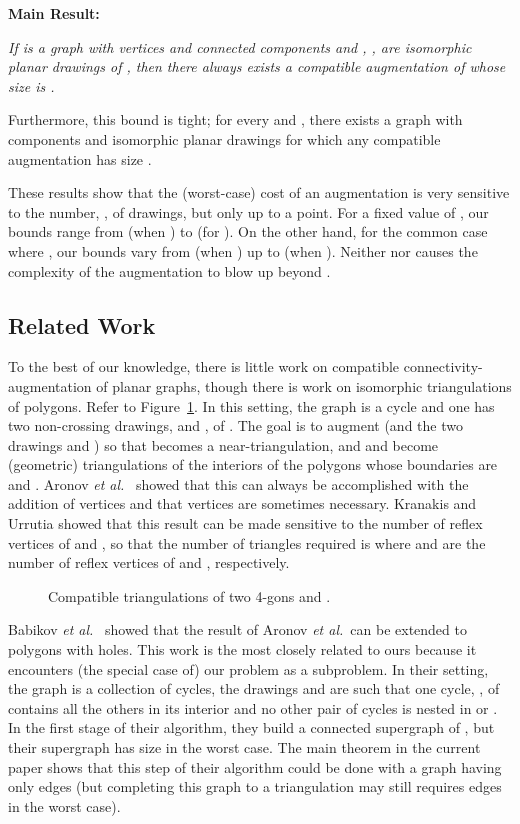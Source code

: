 \documentclass[11pt]{patmorin}
\newcommand{\etal}{\emph{et al.}}
\begin{document}
\noindent\textbf{Main Result:} {\itshape If  is a graph
with  vertices and  connected components and
, , are isomorphic planar drawings of , then there always exists a compatible augmentation of 
whose size is .

Furthermore, this bound is tight; for every  and , there exists a graph 
with  components and  isomorphic planar drawings for which any compatible
augmentation has size .}

These results show that the (worst-case) cost of an augmentation is very
sensitive to the number, , of drawings, but only up to a point.
For a fixed value of , our bounds range from  (when
) to  (for ).  On the other hand, for the
common case where , our bounds vary from  (when ) up to  (when ).  Neither  nor 
causes the complexity of the augmentation to blow up beyond .

\subsection{Related Work}

To the best of our knowledge, there is little work on
compatible connectivity-augmentation of planar graphs, though
there is work on isomorphic triangulations of polygons.  Refer to
Figure~\ref{fig:compatible-triangs}.  In this setting, the graph
 is a cycle and one has two non-crossing drawings, 
and , of . The goal is to augment  (and the
two drawings  and ) so that  becomes a near-triangulation,
and  and  become (geometric) triangulations of the interiors
of the polygons whose boundaries are  and .  Aronov \etal\
\cite{aronov.seidel.ea:on} showed that this can always
be accomplished with the addition of  vertices and that
 vertices are sometimes necessary.  Kranakis and Urrutia
\cite{kranakis.urrutia:isomorphic} showed that this result can be made
sensitive to the number of reflex vertices of  and , so that the
number of triangles required is  where  and  are the
number of reflex vertices of  and , respectively.

\begin{figure}
  \caption{Compatible triangulations of two 4-gons  and .}
  \label{fig:compatible-triangs}
\end{figure}

Babikov \etal\ \cite{babikov.souvaine.ea:constructing} showed that the result of Aronov \etal\ can be extended to polygons with holes. This work is the most closely related to ours because it encounters (the special case  of) our problem as a subproblem. In their setting, the graph  is a collection of  cycles, the drawings  and  are such that one cycle, , of  contains all the others in its interior and no other pair of cycles is nested in  or . In the first stage of their algorithm, they build a connected supergraph  of , but their supergraph has size  in the worst case.  The main theorem in the current paper shows that this step of their algorithm could be done with a graph  having only  edges (but completing this graph to a triangulation may still requires  edges in the worst case).
\end{document}
